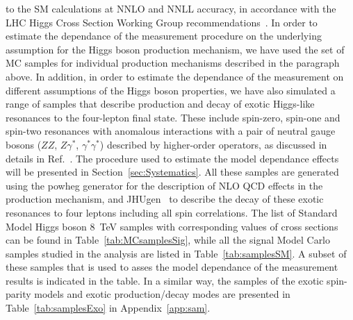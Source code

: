 to the SM calculations at NNLO and NNLL accuracy, in accordance with the LHC Higgs Cross Section Working Group 
recommendations~\cite{LHCHiggsCrossSectionWorkingGroup:2013tqa}. In order to estimate the dependance of the measurement procedure on the underlying 
assumption for the Higgs boson production mechanism, we have used the set of MC samples for individual production mechanisms described in the paragraph 
above. In addition, in order to estimate the dependance of the measurement on different assumptions of the Higgs boson properties, we have also simulated
a range of samples that describe production and decay of exotic Higgs-like resonances to the four-lepton final state.
These include spin-zero, spin-one and spin-two resonances with anomalous interactions with a pair of neutral gauge bosons
($ZZ$, $Z\gamma^{*}$, $\gamma^{*}\gamma^{*}$) described by higher-order operators, as discussed in details in Ref.~\cite{Khachatryan:2014kca}. The 
procedure
used to estimate the model dependance effects will be presented in Section~\ref{sec:Systematics}. All these samples are generated using the {\sc powheg} 
generator for the description of NLO QCD effects in the production mechanism, and {\sc JHUgen}~\cite{Gao:2010qx,Bolognesi:2012mm,Anderson:2013afp} to 
describe the decay of these exotic resonances to four leptons including all spin correlations.
The list of Standard Model Higgs boson 8~TeV samples with corresponding values of cross sections can be found in Table~\ref{tab:MCsamplesSig}, while
all the signal Model Carlo samples studied in the analysis are listed in Table~\ref{tab:samplesSM}. A subset of these samples that is used to asses the
model dependance of the measurement results is indicated in the table.
In a similar way, the samples of the exotic spin-parity models and exotic production/decay modes are presented in Table~\ref{tab:samplesExo} in 
Appendix~\ref{app:sam}.
